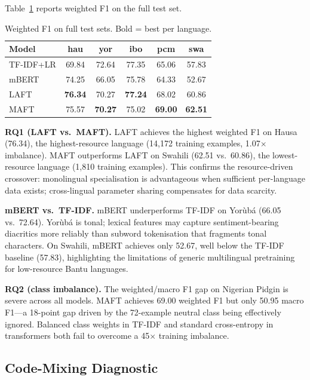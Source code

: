 \documentclass[11pt,twocolumn]{article}
\begin{document}
Table~\ref{tab:main} reports weighted F1 on the full test set.

\begin{table}[t]
\centering
\small
\setlength{\tabcolsep}{4pt}
\begin{tabular}{lccccc}
\toprule
\textbf{Model} & \textbf{hau} & \textbf{yor} & \textbf{ibo} & \textbf{pcm} & \textbf{swa} \\
\midrule
TF-IDF+LR & 69.84 & 72.64 & 77.35 & 65.06 & 57.83 \\
mBERT     & 74.25 & 66.05 & 75.78 & 64.33 & 52.67 \\
LAFT      & \textbf{76.34} & 70.27 & \textbf{77.24} & 68.02 & 60.86 \\
MAFT      & 75.57 & \textbf{70.27} & 75.02 & \textbf{69.00} & \textbf{62.51} \\
\bottomrule
\end{tabular}
\caption{Weighted F1 on full test sets. Bold = best per language.}
\label{tab:main}
\end{table}

\textbf{RQ1 (LAFT vs.\ MAFT).} LAFT achieves the highest weighted F1 on Hausa (76.34), the
highest-resource language (14,172 training examples, 1.07$\times$ imbalance). MAFT outperforms
LAFT on Swahili (62.51 vs.\ 60.86), the lowest-resource language (1,810 training examples).
This confirms the resource-driven crossover: monolingual specialisation is advantageous when
sufficient per-language data exists; cross-lingual parameter sharing compensates for data scarcity.

\textbf{mBERT vs.\ TF-IDF.} mBERT underperforms TF-IDF on Yor\`{u}b\'{a} (66.05 vs.\ 72.64).
Yor\`{u}b\'{a} is tonal; lexical features may capture sentiment-bearing diacritics more reliably
than subword tokenisation that fragments tonal characters. On Swahili, mBERT achieves only 52.67,
well below the TF-IDF baseline (57.83), highlighting the limitations of generic multilingual
pretraining for low-resource Bantu languages.

\textbf{RQ2 (class imbalance).} The weighted/macro F1 gap on Nigerian Pidgin is severe across
all models. MAFT achieves 69.00 weighted F1 but only 50.95 macro F1---a 18-point gap driven by
the 72-example neutral class being effectively ignored. Balanced class weights in TF-IDF and
standard cross-entropy in transformers both fail to overcome a 45$\times$ training imbalance.

\subsection{Code-Mixing Diagnostic}
\end{document}
